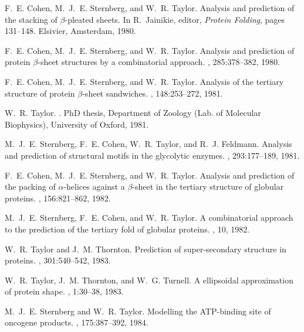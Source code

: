 \begin{thebibliography}{100}

F.~E. Cohen, M.~J.~E. Sternberg, and W.~R. Taylor.
\newblock Analysis and prediction of the stacking of $\beta$-pleated sheets.
\newblock In R.~Jainikie, editor, {\em Protein Folding}, pages 131--148.
  Elsivier, Amsterdam, 1980.

F.~E. Cohen, M.~J.~E. Sternberg, and W.~R. Taylor.
\newblock Analysis and prediction of protein $\beta$-sheet structures by a
  combinatorial approach.
, 285:378--382, 1980.

F.~E. Cohen, M.~J.~E. Sternberg, and W.~R. Taylor.
\newblock Analysis of the tertiary structure of protein $\beta$-sheet
  sandwiches.
, 148:253--272, 1981.

W.~R. Taylor.
.
\newblock PhD thesis, Department of Zoology (Lab. of Molecular Biophysics),
  University of Oxford, 1981.

M.~J.~E. Sternberg, F.~E. Cohen, W.~R. Taylor, and R.~J. Feldmann.
\newblock Analysis and prediction of structural motifs in the glycolytic
  enzymes.
, 293:177--189, 1981.

F.~E. Cohen, M.~J.~E. Sternberg, and W.~R. Taylor.
\newblock Analysis and prediction of the packing of $\alpha$-helices against a
  $\beta$-sheet in the tertiary structure of globular proteins.
, 156:821--862, 1982.

M.~J.~E. Sternberg, F.~E. Cohen, and W.~R. Taylor.
\newblock A combinatorial approach to the prediction of the tertiary fold of
  globular proteins.
, 10, 1982.

W.~R. Taylor and J.~M. Thornton.
\newblock Prediction of super-secondary structure in proteins.
, 301:540--542, 1983.

W.~R. Taylor, J.~M. Thornton, and W.~G. Turnell.
\newblock A ellipsoidal approximation of protein shape.
, 1:30--38, 1983.

M.~J.~E. Sternberg and W.~R. Taylor.
\newblock Modelling the {ATP}-binding site of oncogene products.
, 175:387--392, 1984.


\end{thebibliography}
